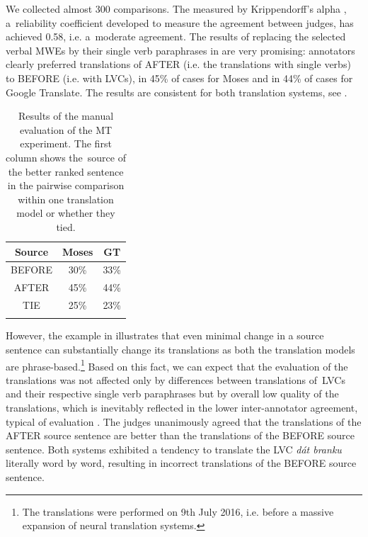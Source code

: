 \documentclass[output=paper
,modfonts
,nonflat]{langsci/langscibook}
\begin{document}
We collected almost 300 comparisons. The  
measured by Krippendorff's alpha \citep{Krippendorff2007}, a~reliability 
coefficient developed to measure the agreement between judges, has achieved
0.58, i.e. a~moderate agreement. The results of replacing the selected verbal 
MWEs by their single verb paraphrases in  are very 
promising: annotators clearly preferred translations of AFTER  (i.e. the 
translations with single verbs) to BEFORE (i.e. with LVCs), in 45\% of cases 
for Moses and in 44\% of cases for Google Translate. The results are consistent
for both translation systems, see .

\begin{table}[tb]
	\centering
	\begin{tabular}{ccc}
	\lsptoprule
		Source & Moses   & GT    \\ \midrule
		BEFORE & 30\%    & 33\%  \\
		AFTER  & 45\%    & 44\%  \\
		TIE    & 25\%    & 23\%  \\
	\lspbottomrule
	\end{tabular}
	\caption{Results of the manual evaluation of the MT experiment. The first 
	column shows the~source of the better ranked sentence in the pairwise 
	comparison within one translation model or whether they tied.}
	\label{annotation}
\end{table}

However, the example in  illustrates that even minimal change in 
a source sentence can substantially change its translations as both the 
translation models are phrase-based.\footnote{The translations were 
performed on 9th July 2016, i.e. before a massive expansion of neural 
translation systems.} Based on this fact, we can expect that the evaluation of 
the translations was not affected only by differences between translations 
of~LVCs and their respective single verb paraphrases but by overall low quality 
of the translations, which is inevitably reflected in the lower inter-annotator 
agreement, typical of  evaluation \citep{wmt13}. 
The judges unanimously agreed that the translations of the AFTER source sentence are better than the translations of the BEFORE source sentence. Both systems exhibited a tendency to translate the LVC \textit{dát branku} literally word by word, resulting in incorrect translations of the BEFORE source sentence.
\end{document}
